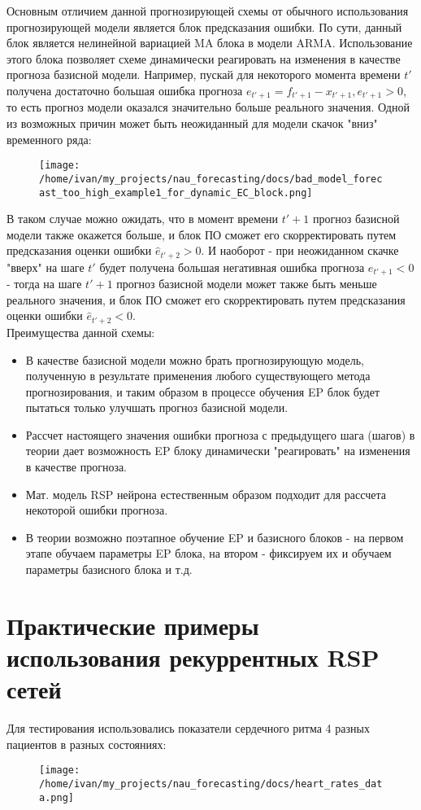 \documentclass[11pt]{article}
\begin{document}
Основным отличием данной прогнозирующей схемы от обычного использования прогнозирующей модели является блок предсказания ошибки. По сути, данный блок является нелинейной вариацией MA блока в модели ARMA. Использование этого блока позволяет схеме динамически реагировать на изменения в качестве прогноза базисной модели. Например, пускай для некоторого момента времени $t'$ получена достаточно большая ошибка прогноза $ e_{t'+1} = f_{t'+1} - x_{t'+1}, e_{t'+1} > 0 $, то есть прогноз модели оказался значительно больше реального значения. Одной из возможных причин может быть неожиданный для модели скачок "вниз" временного ряда:
\begin{figure}[H]
\centering
\texttt{[image: /home/ivan/my\_projects/nau\_forecasting/docs/bad\_model\_forecast\_too\_high\_example1\_for\_dynamic\_EC\_block.png]}
\label{}
\end{figure}

В таком случае можно ожидать, что в момент времени $t'+1$ прогноз базисной модели также окажется больше, и блок ПО сможет его скорректировать путем предсказания оценки ошибки $ \hat{e}_{t'+2} > 0$. И наоборот - при неожиданном скачке "вверх" на шаге $t'$ будет получена большая негативная ошибка прогноза $ e_{t'+1} < 0 $ - тогда на шаге $t'+1$ прогноз базисной модели может также быть меньше реального значения, и блок ПО сможет его скорректировать путем предсказания оценки ошибки $\hat{e}_{t'+2} < 0$.
\\ 
Преимущества данной схемы:
\begin{itemize}
\item В качестве базисной модели можно брать прогнозирующую модель, полученную в результате применения любого существующего метода прогнозирования, и таким образом в процессе обучения EP блок будет пытаться только улучшать прогноз базисной модели.
\item Рассчет настоящего значения ошибки прогноза с предыдущего шага (шагов) в теории дает возможность EP блоку динамически "реагировать" на изменения в качестве прогноза.
\item Мат. модель RSP нейрона естественным образом подходит для рассчета некоторой ошибки прогноза.
\item В теории возможно поэтапное обучение EP и базисного блоков - на первом этапе обучаем параметры EP блока, на втором - фиксируем их и обучаем параметры базисного блока и т.д.
\end{itemize}

\section*{Практические примеры использования рекуррентных RSP сетей}
Для тестирования использовались показатели сердечного ритма 4 разных пациентов в разных состояниях:
\begin{figure}[H]
\centering
\texttt{[image: /home/ivan/my\_projects/nau\_forecasting/docs/heart\_rates\_data.png]}
\label{}
\end{figure}
\end{document}
